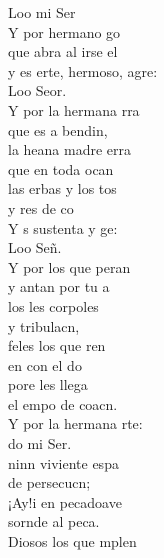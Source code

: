 \begin{cancion}
	Loo mi Ser\\
	Y por  hermano go\\
	que abra al irse el \\
	y es erte, hermoso, agre:\\
	Loo Seor.\\
	Y por la hermana rra\\
	que es a bendin, \\
	la heana madre erra\\
	que  en toda ocan \\
	las erbas y los tos \\
	y res de co\\
	Y s sustenta y ge: \\
	Loo Señ. \\
	Y por los que peran\\
	y antan por tu a\\
	los les corpoles \\
	y  tribulacn,\\
	feles los que ren \\
	en  con el do\\
	pore les llega\\
	el empo de  coacn. \\
	Y por la hermana rte:\\
	do mi Ser.\\
	ninn viviente espa  \\
	de  persecucn;\\
	¡Ay!i en pecadoave\\
	sornde al peca.\\
	Diosos los que mplen \\

\end{cancion}
